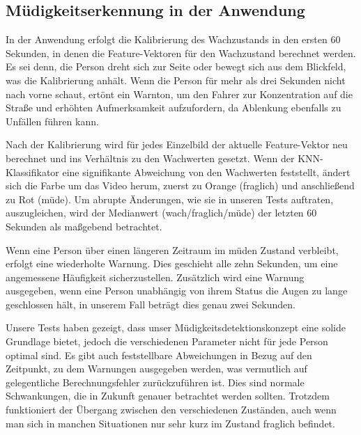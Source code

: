 \subsection{Müdigkeitserkennung in der Anwendung}
\label{subsec:runningdrowsinessdetection}

In der Anwendung erfolgt die Kalibrierung des Wachzustands in den ersten 60 Sekunden, in denen die Feature-Vektoren für den Wachzustand berechnet werden. Es sei denn, die Person dreht sich zur Seite oder bewegt sich aus dem Blickfeld, was die Kalibrierung anhält. Wenn die Person für mehr als drei Sekunden nicht nach vorne schaut, ertönt ein Warnton, um den Fahrer zur Konzentration auf die Straße und erhöhten Aufmerksamkeit aufzufordern, da Ablenkung ebenfalls zu Unfällen führen kann.

Nach der Kalibrierung wird für jedes Einzelbild der aktuelle Feature-Vektor neu berechnet und ins Verhältnis zu den Wachwerten gesetzt. Wenn der KNN-Klassifikator eine signifikante Abweichung von den Wachwerten feststellt, ändert sich die Farbe um das Video herum, zuerst zu Orange (\glqq fraglich\grqq{}) und anschließend zu Rot (\glqq müde\grqq{}). Um abrupte Änderungen, wie sie in unseren Tests auftraten, auszugleichen, wird der Medianwert (wach/fraglich/müde) der letzten 60 Sekunden als maßgebend betrachtet.

Wenn eine Person über einen längeren Zeitraum im müden Zustand verbleibt, erfolgt eine wiederholte Warnung. Dies geschieht alle zehn Sekunden, um eine angemessene Häufigkeit sicherzustellen. Zusätzlich wird eine Warnung ausgegeben, wenn eine Person unabhängig von ihrem Status die Augen zu lange geschlossen hält, in unserem Fall beträgt dies genau zwei Sekunden.

Unsere Tests haben gezeigt, dass unser Müdigkeitsdetektionskonzept eine solide Grundlage bietet, jedoch die verschiedenen Parameter nicht für jede Person optimal sind. Es gibt auch feststellbare Abweichungen in Bezug auf den Zeitpunkt, zu dem Warnungen ausgegeben werden, was vermutlich auf gelegentliche Berechnungsfehler zurückzuführen ist. Dies sind normale Schwankungen, die in Zukunft genauer betrachtet werden sollten. Trotzdem funktioniert der Übergang zwischen den verschiedenen Zuständen, auch wenn man sich in manchen Situationen nur sehr kurz im Zustand \glqq fraglich\grqq{} befindet.


